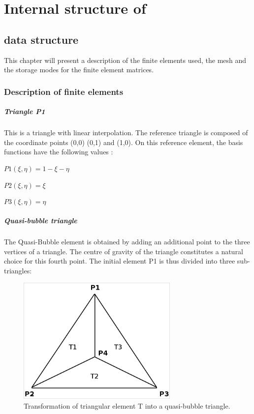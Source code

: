 \chapter{Internal structure of \bief}
\label{ref:internalbief}

\section{\bief data structure}

This chapter will present a description of the finite elements used, the mesh
and the storage modes for the finite element matrices.

\subsection{Description of finite elements}

\paragraph{Triangle P1}

This is a triangle with linear interpolation. The reference triangle is
composed of the coordinate points (0,0)  (0,1)  and  (1,0). On this reference
element, the basis functions have the following values :

$P1(\xi,\eta) = 1 - \xi - \eta$

$P2(\xi,\eta) =     \xi$

$P3(\xi,\eta) =           \eta$

\paragraph{Quasi-bubble triangle}

The Quasi-Bubble element is obtained by adding an additional point to the three
vertices of a triangle. The centre of gravity of the triangle constitutes a
natural choice for this fourth point. The initial element P1 is thus divided
into three sub-triangles:

\begin{figure}[H]%
\begin{center}
%
  \includegraphics[width=0.7\textwidth]{./graphics/quassi-bubble}
%
\end{center}
\caption
{Transformation of triangular element T into a quasi-bubble triangle.}
\label{fig:quassi-bubble}
\end{figure}

